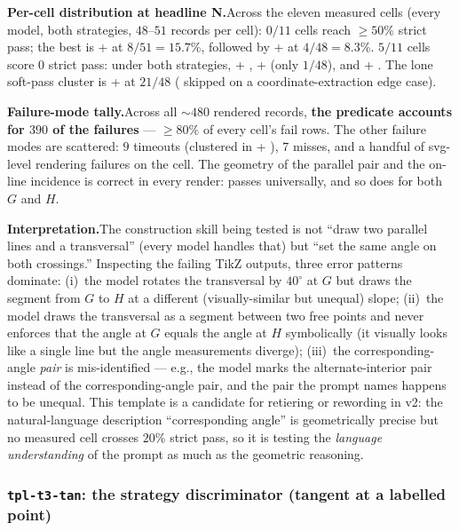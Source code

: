 \noindent\textbf{Per-cell distribution at headline N.}\quad Across the eleven measured cells (every model, both strategies, $48$--$51$ records per cell):
$0/11$ cells reach $\geq 50\%$ strict pass; the best is \sonnet + \structured at $8/51 = 15.7$\%, followed by \haiku + \rawcode at $4/48 = 8.3$\%.
$5/11$ cells score $0$ strict pass: \gpt under both strategies, \sonnet + \rawcode, \opus + \rawcode (only $1/48$), and \geminiflash + \rawcode.
The lone soft-pass cluster is \geminipro + \rawcode at $21/48$ ( skipped on a coordinate-extraction edge case).

\noindent\textbf{Failure-mode tally.}\quad Across all $\sim 480$ rendered records, \textbf{the  predicate accounts for $390$ of the failures} --- $\geq 80\%$ of every cell's fail rows. The other failure modes are scattered: $9$ timeouts (clustered in \opus + \structured), $7$  misses, and a handful of svg-level rendering failures on the \geminiflash cell.
The geometry of the parallel pair and the on-line incidence is correct in every render:  passes universally, and so does  for both $G$ and $H$.

\noindent\textbf{Interpretation.}\quad The construction skill being tested is not ``draw two parallel lines and a transversal'' (every model handles that) but ``set the same angle on both crossings.''
Inspecting the failing TikZ outputs, three error patterns dominate:
(i)~the model rotates the transversal by $40^\circ$ at $G$ but draws the segment from $G$ to $H$ at a different (visually-similar but unequal) slope;
(ii)~the model draws the transversal as a segment between two free points and never enforces that the angle at $G$ equals the angle at $H$ symbolically (it visually looks like a single line but the angle measurements diverge);
(iii)~the corresponding-angle \emph{pair} is mis-identified --- e.g., the model marks the alternate-interior pair instead of the corresponding-angle pair, and the pair the prompt names happens to be unequal.
This template is a candidate for retiering or rewording in v2: the natural-language description ``corresponding angle'' is geometrically precise but no measured cell crosses $20\%$ strict pass, so it is testing the \emph{language understanding} of the prompt as much as the geometric reasoning.

\subsubsection{\texttt{tpl-t3-tan}: the strategy discriminator (tangent at a labelled point)}
\label{sssec:tan_case}

